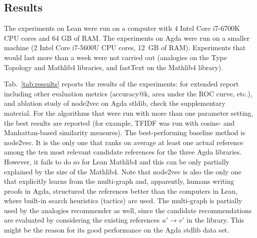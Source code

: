 \documentclass{article}
\begin{document}
\subsection{Results}\label{sec:results}

The experiments on Lean were run on a computer with 4 Intel Core i7-6700K CPU cores and 64 GB of RAM. The experiments on Agda were run on a smaller machine (2 Intel Core i7-5600U CPU cores, 12~GB of RAM). Experiments that would last more than a week were not carried out (analogies on the Type Topology and Mathlib4 libraries, and fastText on the Mathlib4 library).

Tab.~\ref{tab:ressults} reports the results of the experiments: for extended report including other evaluation metrics (accuracy@k, area under the ROC curve, etc.), and ablation study of node2vec on Agda stldib, check the supplementary material. For the algorithms that were run with more than one parameter setting, the best results are reported (for example, TFIDF was run with cosine- and Manhattan-based similarity measures). The best-performing baseline method is node2vec. It is the only one that ranks on average at least one actual reference among the ten most relevant candidate references for the three Agda libraries. However, it fails to do so for Lean Mathlib4 and this can be only partially explained by the size of the Mathlib4. Note that node2vec is also the only one that explicitly learns from the multi-graph and, apparently, humans writing proofs in Agda, structured the references better than the computers in Lean, where built-in search heuristics (tactics) are used. The multi-graph is partially used by the analogies recommender as well, since the candidate recommendations are evaluated by considering the existing references $u'\to v'$ in the library. This might be the reason for its good performance on the Agda stdlib data set.
\end{document}
